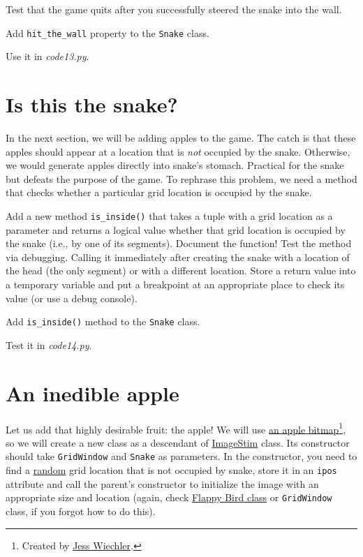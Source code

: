 \documentclass[
]{book}
\begin{document}
Test that the game quits after you successfully steered the snake into the wall.

Add \texttt{hit\_the\_wall} property to the \texttt{Snake} class.

Use it in \emph{code13.py}.

\hypertarget{is-this-the-snake}{%
\section{Is this the snake?}\label{is-this-the-snake}}

In the next section, we will be adding apples to the game. The catch is that these apples should appear at a location that is \emph{not} occupied by the snake. Otherwise, we would generate apples directly into snake's stomach. Practical for the snake but defeats the purpose of the game. To rephrase this problem, we need a method that checks whether a particular grid location is occupied by the snake.

Add a new method \texttt{is\_inside()} that takes a tuple with a grid location as a parameter and returns a logical value whether that grid location is occupied by the snake (i.e., by one of its segments). Document the function! Test the method via debugging. Calling it immediately after creating the snake with a location of the head (the only segment) or with a different location. Store a return value into a temporary variable and put a breakpoint at an appropriate place to check its value (or use a debug console).

Add \texttt{is\_inside()} method to the \texttt{Snake} class.

Test it in \emph{code14.py}.

\hypertarget{an-inedible-apple}{%
\section{An inedible apple}\label{an-inedible-apple}}

Let us add that highly desirable fruit: the apple! We will use \href{material/apple.png}{an apple bitmap}\footnote{Created by \href{https://openclipart.org/artist/cyanidecupcake}{Jess Wiechler}.}, so we will create a new class as a descendant of \href{https://psychopy.org/api/visual/imagestim.html\#psychopy.visual.ImageStim}{ImageStim} class. Its constructor should take \texttt{GridWindow} and \texttt{Snake} as parameters. In the constructor, you need to find a \href{https://docs.python.org/3/library/random.html\#random.randrange}{random} grid location that is not occupied by snake, store it in an \texttt{ipos} attribute and call the parent's constructor to initialize the image with an appropriate size and location (again, check \protect\hyperlink{flappy-bird-class}{Flappy Bird class} or \texttt{GridWindow} class, if you forgot how to do this).
\end{document}
